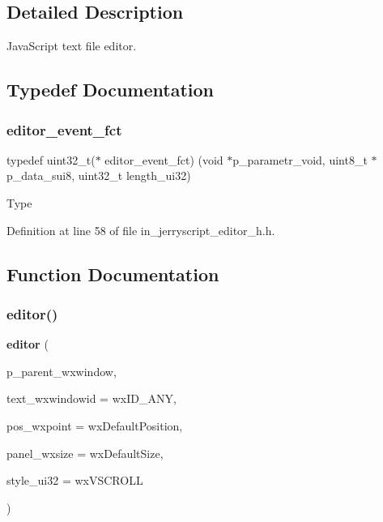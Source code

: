 \subsection{Detailed Description}
Java\+Script text file editor. 



\subsection{Typedef Documentation}
\mbox{\label{group___editor_ga20f4bfcf0a897eefd73be09de813f118}} 
\subsubsection{editor\_event\_fct}
{\footnotesize\ttfamily typedef uint32\+\_\+t($\ast$ editor\+\_\+event\+\_\+fct) (void $\ast$p\+\_\+parametr\+\_\+void, uint8\+\_\+t $\ast$p\+\_\+data\+\_\+sui8, uint32\+\_\+t length\+\_\+ui32)}

Type 

Definition at line 58 of file in\+\_\+jerryscript\+\_\+editor\+\_\+h.\+h.



\subsection{Function Documentation}
\mbox{\label{group___editor_gad6d21023c29b49cfe1eb7a536ce1c3d2}} 
\subsubsection{editor()}
{\footnotesize\ttfamily \textbf{ editor} (\begin{DoxyParamCaption}\item[{wx\+Window $\ast$}]{p\+\_\+parent\+\_\+wxwindow,  }\item[{wx\+Window\+ID}]{text\+\_\+wxwindowid = {\ttfamily wxID\+\_\+ANY},  }\item[{const wx\+Point \&}]{pos\+\_\+wxpoint = {\ttfamily wxDefaultPosition},  }\item[{const wx\+Size \&}]{panel\+\_\+wxsize = {\ttfamily wxDefaultSize},  }\item[{uint32\+\_\+t}]{style\+\_\+ui32 = {\ttfamily wxVSCROLL} }\end{DoxyParamCaption})}



